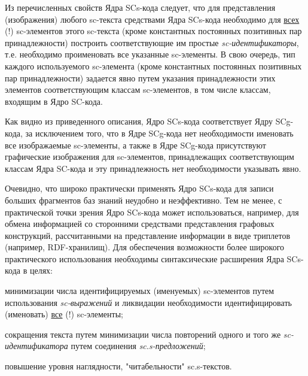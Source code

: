 Из перечисленных свойств Ядра SCs-кода следует, что для представления (изображения) любого \mbox{sc-текста} средствами Ядра SCs-кода необходимо для \uline{всех} (!) sc-элементов этого \mbox{sc-текста} (кроме константных постоянных позитивных пар принадлежности) построить соответствующие им простые \textit{sc-идентификаторы}, т.е. необходимо проименовать все указанные sc-элементы. В свою очередь, тип каждого используемого \mbox{sc-элемента} (кроме константных постоянных позитивных пар принадлежности) задается явно путем указания принадлежности этих элементов соответствующим классам sc-элементов, в том числе классам, входящим в Ядро SC-кода.

Как видно из приведенного описания, Ядро SCs-кода соответствует Ядру SCg-кода, за исключением того, что в Ядре SCg-кода нет необходимости именовать все изображаемые sc-элементы, а также в Ядре SCg-кода присутствуют графические изображения для sc-элементов, принадлежащих соответствующим классам Ядра SC-кода и эту принадлежность нет необходимости указывать явно.

Очевидно, что широко практически применять Ядро SCs-кода для записи больших фрагментов баз знаний неудобно и неэффективно. Тем не менее, с практической точки зрения Ядро SCs-кода может использоваться, например, для обмена информацией со сторонними средствами представления графовых конструкций, рассчитанными на представление информации в виде триплетов (например, RDF-хранилищ).
Для обеспечения возможности более широкого практического использования необходимы синтаксические расширения Ядра SCs-кода в целях:
\begin{textitemize}
	\item минимизации числа идентифицируемых (именуемых) sc-элементов путем использования \textit{sc-выражений} и ликвидации необходимости идентифицировать (именовать) \uline{все} (!) sc-элементы;
	\item сокращения текста путем минимизации числа повторений одного и того же \textit{sc-идентификатора} путем соединения \textit{sc.s-предложений};
	\item повышение уровня наглядности, "читабельности"{} sc.s-текстов.
\end{textitemize}

\begin{SCn}
\end{SCn}

